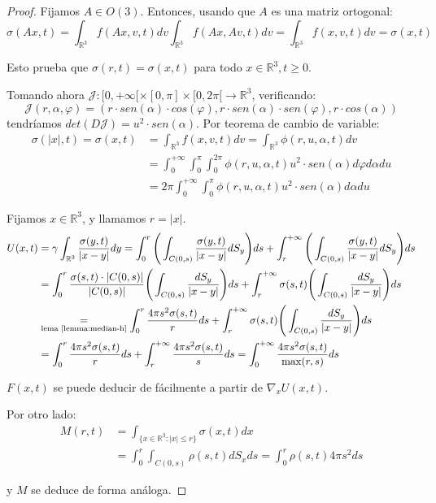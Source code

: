 \documentclass[a4paper,10pt]{scrartcl}
\theoremstyle{definition}
\numberwithin{equation}{section}
\begin{document}
\begin{proof}
Fijamos $A \in O(3)$. Entonces, usando que $A$ es una matriz ortogonal:
 \[
 \sigma(Ax,t) = \int_{\mathbb{R}^3} f(Ax,v,t) dv \int_{\mathbb{R}^3} f(Ax,Av,t) dv = \int_{\mathbb{R}^3} f(x,v,t) dv = \sigma(x,t)
 \]
 
 Esto prueba que $\sigma(r,t) = \sigma(x,t)$ para todo $x\in \mathbb{R}^3, t\ge 0$.
 
 Tomando ahora $\mathcal{J}:[0,+\infty[ \times [0,\pi] \times [0,2\pi[ \rightarrow \mathbb{R}^3$, verificando:
 \[\mathcal{J}(r,\alpha, \varphi) = (r\cdot sen(\alpha) \cdot cos(\varphi), r\cdot sen(\alpha) \cdot sen(\varphi), r\cdot cos(\alpha))\]
 tendríamos $det(D\mathcal{J}) = u^2 \cdot sen(\alpha)$. Por teorema de cambio de variable: 
 \begin{align*}
  \sigma(|x|,t) = \sigma(x,t) &= \int_{\mathbb{R}^3} f(x,v,t) dv = \int_{\mathbb{R}^3} \phi(r,u,\alpha,t) dv \\
  &= \int_0^{+\infty} \int_0^\pi \int_0^{2\pi} \phi(r,u,\alpha,t) u^2 \cdot sen(\alpha) d\varphi d\alpha du \\
  &= 2\pi \int_0^{+\infty} \int_0^\pi \phi(r,u,\alpha,t) u^2 \cdot sen(\alpha) d\alpha du
 \end{align*}
 
 Fijamos $x\in \mathbb{R}^3$, y llamamos $r=|x|$.
 \begin{align*}
 U(x,t) &= \gamma \int_{\mathbb{R}^3} \frac{\sigma(y,t)}{|x-y|} dy = \int_0^r \Bigg(\int_{C(0,s)} \frac{\sigma(y,t)}{|x-y|} dS_y\Bigg)ds + 
 \int_r^{+\infty} \Bigg(\int_{C(0,s)} \frac{\sigma(y,t)}{|x-y|} dS_y\Bigg)ds \\
 &= \int_0^r \frac{\sigma(s,t)\cdot |C(0,s)|}{|C(0,s)|} \Bigg(\int_{C(0,s)} \frac{dS_y}{|x-y|}\Bigg) ds + \int_r^{+\infty} \sigma(s,t) \Bigg(\int_{C(0,s)} \frac{dS_y}{|x-y|}\Bigg) ds \\
 &\underset{\textrm{lema \ref{lemma:median-h}}}{=} \int_0^r \frac{4\pi s^2 \sigma(s,t)}{r} ds + 
 \int_r^{+\infty} \sigma(s,t) \Bigg(\int_{C(0,s)} \frac{dS_y}{|x-y|} \Bigg) ds \\
 &= \int_0^r \frac{4\pi s^2 \sigma(s,t)}{r} ds + 
 \int_r^{+\infty} \frac{4\pi s^2 \sigma(s,t)}{s} ds = \int_0^{+\infty} \frac{4\pi s^2 \sigma(s,t)}{\max(r,s)} ds
 \end{align*}
 
 $F(x,t)$ se puede deducir de fácilmente a partir de $\nabla_x U(x,t)$.
 
 Por otro lado:
 \begin{align*}
 M(r,t) &= \int_{\{x\in\mathbb{R}^3:|x| \le r\}} \sigma(x,t) dx\\
 &= \int_0^r \int_{C(0,s)} \rho(s,t) dS_{x} ds = \int_0^r \rho(s,t) 4 \pi s^2 ds
 \end{align*}
 
 y $M$ se deduce de forma análoga.
\end{proof}
\end{document}
